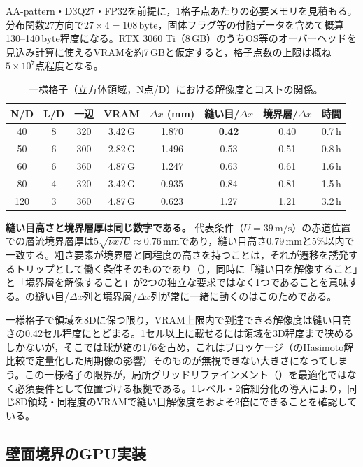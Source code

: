 AA-pattern・D3Q27・FP32を前提に，1格子点あたりの必要メモリを見積もる。分布関数27方向で\(27\times4=108\,\text{byte}\)，固体フラグ等の付随データを含めて概算130--140\,byte程度になる。RTX 3060 Ti（8\,GB）のうちOS等のオーバーヘッドを見込み計算に使えるVRAMを約7\,GBと仮定すると，格子点数の上限は概ね\(5\times10^7\)点程度となる。

\begin{table}[H]
	\centering
	\caption{一様格子（立方体領域，N点/D）における解像度とコストの関係。}
	\label{tab:resolution-budget}
	\begin{tabular}{cccccccc}
		\Hline{1.5pt}
		N/D & L/D & 一辺 & VRAM & \(\Delta x\) (mm) & 縫い目/\(\Delta x\) & 境界層/\(\Delta x\) & 時間 \\
		\hline
		40  & 8 & 320 & 3.42\,G & 1.870 & \textbf{0.42} & 0.40 & 0.7\,h \\
		50  & 6 & 300 & 2.82\,G & 1.496 & 0.53 & 0.51 & 0.8\,h \\
		60  & 6 & 360 & 4.87\,G & 1.247 & 0.63 & 0.61 & 1.6\,h \\
		80  & 4 & 320 & 3.42\,G & 0.935 & 0.84 & 0.81 & 1.5\,h \\
		120 & 3 & 360 & 4.87\,G & 0.623 & 1.27 & 1.21 & 3.2\,h \\
		\hline
	\end{tabular}
\end{table}

\textbf{縫い目高さと境界層厚は同じ数字である。} 代表条件（\(U=39\,\text{m/s}\)）の赤道位置での層流境界層厚は\(5\sqrt{\nu x/U}\approx0.76\,\text{mm}\)であり，縫い目高さ0.79\,mmと5\%以内で一致する。粗さ要素が境界層と同程度の高さを持つことは，それが遷移を誘発するトリップとして働く条件そのものであり（），同時に「縫い目を解像すること」と「境界層を解像すること」が2つの独立な要求ではなく1つであることを意味する。の縫い目/\(\Delta x\)列と境界層/\(\Delta x\)列が常に一緒に動くのはこのためである。

一様格子で領域を8Dに保つ限り，VRAM上限内で到達できる解像度は縫い目高さの0.42セル程度にとどまる。1セル以上に載せるには領域を3D程度まで狭めるしかないが，そこでは球が箱の1/6を占め，これはブロッケージ（のHasimoto解比較で定量化した周期像の影響）そのものが無視できない大きさになってしまう。この一様格子の限界が，局所グリッドリファインメント（）を最適化ではなく必須要件として位置づける根拠である。1レベル・2倍細分化の導入により，同じ8D領域・同程度のVRAMで縫い目解像度をおよそ2倍にできることを確認している。

\subsection{壁面境界のGPU実装}

